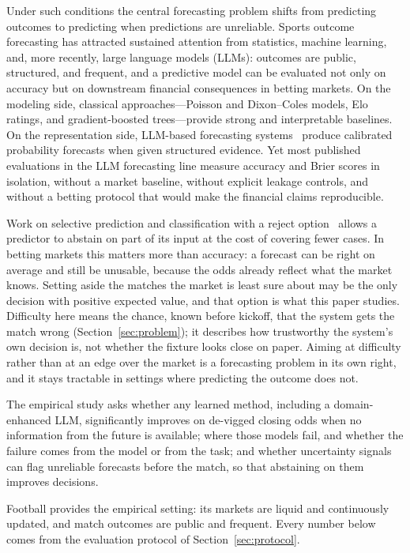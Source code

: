 \documentclass[10pt]{article}
\begin{document}
Under such conditions the central forecasting problem shifts from predicting
outcomes to predicting when predictions are unreliable. Sports outcome
forecasting has attracted sustained attention from statistics, machine
learning, and, more recently, large language models (LLMs): outcomes are public,
structured, and frequent, and a predictive model can be evaluated not only on
accuracy but on downstream financial consequences in betting markets. On the
modeling side, classical approaches---Poisson and Dixon--Coles models, Elo
ratings, and gradient-boosted trees---provide strong and interpretable
baselines. On the representation side, LLM-based forecasting
systems~\cite{halawi2024,aia2025,llmprophet2025} produce calibrated probability
forecasts when given structured evidence. Yet most published evaluations in the
LLM forecasting line measure accuracy and Brier scores in isolation, without a
market baseline, without explicit leakage controls, and without a betting
protocol that would make the financial claims reproducible.

Work on selective prediction and classification with a reject
option~\cite{chow1970,geifman2017,elyaniv2010} allows a predictor to abstain on
part of its input at the cost of covering fewer cases. In betting markets this
matters more than accuracy: a forecast can be right on average and still be
unusable, because the odds already reflect what the market knows. Setting aside
the matches the market is least sure about may be the only decision with
positive expected value, and that option is what this paper studies. Difficulty
here means the chance, known before kickoff, that the system gets the match
wrong (Section~\ref{sec:problem}); it describes how trustworthy the system's own
decision is, not whether the fixture looks close on paper. Aiming at difficulty
rather than at an edge over the market is a forecasting problem in its own right,
and it stays tractable in settings where predicting the outcome does not.

The empirical study asks whether any learned method, including a
domain-enhanced LLM, significantly improves on de-vigged closing odds when no
information from the future is available; where those models fail, and whether
the failure comes from the model or from the task; and whether uncertainty
signals can flag unreliable forecasts before the match, so that abstaining on
them improves decisions.

Football provides the empirical setting: its markets are liquid and
continuously updated, and match outcomes are public and frequent. Every number
below comes from the evaluation protocol of Section~\ref{sec:protocol}.
\end{document}
